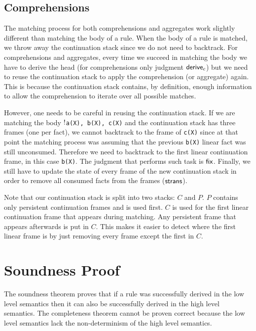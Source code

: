 \subsection{Comprehensions}

The matching process for both comprehensions and aggregates work slightly different than matching the
body of a rule. When the body of a rule is matched, we throw away the continuation stack since we
do not need to backtrack. For comprehensions and aggregates, every time we succeed in matching the body
we have to derive the head (for comprehensions only judgment $\mathsf{derive}_c$) but we need to reuse the
continuation stack to
apply the comprehension (or aggregate) again. This is because the continuation stack contains,
by definition, enough information to allow the comprehension to iterate over all possible matches.

However, one needs to be careful in reusing the continuation stack. If we are matching the body
\texttt{${!}$a(X), b(X), c(X)} and the continuation stack has three frames (one per fact), we cannot
backtrack to the frame of \texttt{c(X)} since at that point the matching process was assuming that the previous
\texttt{b(X)} linear fact was still unconsumed. Therefore we need to backtrack to the first linear
continuation frame, in this case \texttt{b(X)}. The judgment that performs such task is $\mathsf{fix}$.
Finally, we still have to update the state of every frame
of the new continuation stack in order to remove all consumed facts from the frames ($\mathsf{strans}$).

Note that our continuation stack is split into two stacks: $C$ and $P$. $P$ contains only
persistent continuation frames and is used first. $C$ is used for the first linear continuation frame
that appears during matching. Any persistent frame that appears afterwards is put in $C$. This makes
it easier to detect where the first linear frame is by just removing every frame except the first in $C$.

\section{Soundness Proof}

The soundness theorem proves that if a rule was successfully derived in the low level semantics
then it can also be successfully derived in the high level semantics. The completeness theorem cannot
be proven correct because the low level semantics lack the non-determinism of the high level semantics.

